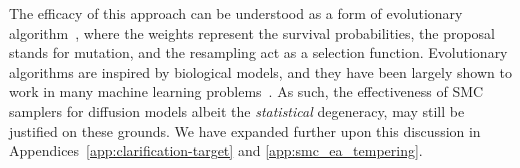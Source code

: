 The efficacy of this approach can be understood as a form of evolutionary algorithm~\citep{back1993overview, yu2010introduction}, where the weights represent the survival probabilities, the proposal stands for mutation, and the resampling act as a selection function.  Evolutionary algorithms are inspired by biological models, and they have been largely shown to work in many machine learning problems~\citep{wang2024application, novikov2025alphaevolvecodingagentscientific, jiang2026smcevolveprincipledscientificdiscovery}. 
As such, the effectiveness of SMC samplers for diffusion models albeit the \emph{statistical} degeneracy, may still be justified 
on these grounds. We have expanded further upon this discussion in Appendices~\ref{app:clarification-target} and \ref{app:smc_ea_tempering}. 

